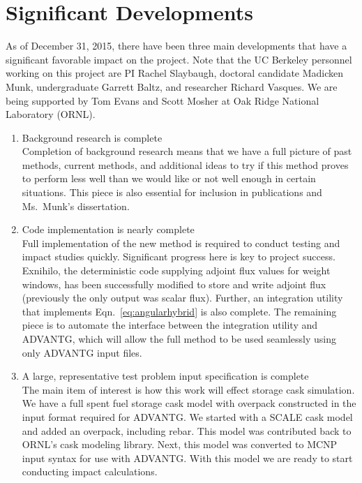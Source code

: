 \documentclass[12pt]{article}
\begin{document}
\section{Significant Developments}
\label{sect::sig-devel}

As of December 31, 2015, there have been three main developments that have a significant favorable impact on the project. Note that 
the UC Berkeley personnel working on this project are PI Rachel Slaybaugh, doctoral candidate Madicken Munk, undergraduate Garrett Baltz, and researcher Richard Vasques. We are being supported by Tom Evans and Scott Mosher at Oak Ridge National Laboratory (ORNL). 
\begin{enumerate}
\item Background research is complete\\
Completion of background research means that we have a full picture of past methods, current methods, and additional ideas to try if this method proves to perform less well than we would like or not well enough in certain situations.
This piece is also essential for inclusion in publications and Ms.\ Munk's dissertation.
 
\item Code implementation is nearly complete\\
Full implementation of the new method is required to conduct testing and impact studies quickly. 
Significant progress here is key to project success.
Exnihilo, the deterministic code supplying adjoint flux values for weight windows, has been successfully modified to store and write adjoint flux (previously the only output was scalar flux). 
Further, an integration utility that implements Eqn.~\eqref{eq:angularhybrid} is also complete. 
The remaining piece is to automate the interface between the integration utility and ADVANTG, which will allow the full method to be used seamlessly using only ADVANTG input files. 

\item A large, representative test problem input specification is complete\\
The main item of interest is how this work will effect storage cask simulation. 
We have a full spent fuel storage cask model with overpack constructed in the input format required for ADVANTG. 
We started with a SCALE cask model and added an overpack, including rebar. 
This model was contributed back to ORNL's cask modeling library. 
Next, this model was converted to MCNP input syntax for use with ADVANTG.
With this model we are ready to start conducting impact calculations.
\end{enumerate}
\end{document}
